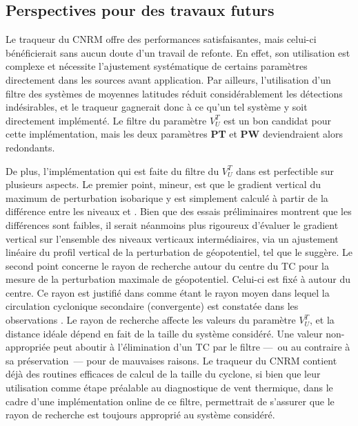 \documentclass[../main.tex]{subfiles}
\begin{document}
\subsection*{Perspectives pour des travaux futurs}

Le traqueur du CNRM offre des performances satisfaisantes, mais celui-ci bénéficierait sans aucun doute d'un travail de refonte. En effet, son utilisation est
complexe et nécessite l'ajustement systématique de certains paramètres directement dans les sources avant application. Par ailleurs, l'utilisation d'un filtre
des systèmes de moyennes latitudes réduit considérablement les détections indésirables, et le traqueur gagnerait donc à ce qu'un tel système y soit
directement implémenté. Le filtre du paramètre $V_U^T$ est un bon candidat pour cette implémentation, mais les deux paramètres \textbf{PT} et \textbf{PW}
deviendraient alors redondants.


De plus, l'implémentation qui est faite du filtre du $V_U^T$ dans \textcite{dulac_assessing_2023} est perfectible sur plusieurs aspects. Le premier point,
mineur, est que le gradient vertical du maximum de perturbation isobarique y est simplement calculé à partir de la différence entre les niveaux  et
. Bien que des essais préliminaires montrent que les différences sont faibles, il serait néanmoins plus rigoureux d'évaluer le gradient vertical sur
l'ensemble des niveaux verticaux intermédiaires, via un ajustement linéaire du profil vertical de la perturbation de géopotentiel, tel que
\textcite{hart_cyclone_2003} le suggère. Le second point concerne le rayon de recherche autour du centre du TC pour la mesure de la perturbation maximale de
géopotentiel. Celui-ci est fixé à  autour du centre. Ce rayon est justifié dans \textcite{hart_cyclone_2003} comme étant le rayon moyen dans lequel la
circulation cyclonique secondaire (convergente) est constatée dans les observations \parencite{frank_structure_1977}. Le rayon de recherche affecte les valeurs
du paramètre $V_U^T$, et la distance idéale dépend en fait de la taille du système considéré. Une valeur non-appropriée peut aboutir à l'élimination d'un TC par
le filtre ---~ou au contraire à sa préservation~--- pour de mauvaises raisons. Le traqueur du CNRM contient déjà des routines efficaces de calcul de la taille
du cyclone, si bien que leur utilisation comme étape préalable au diagnostique de vent thermique, dans le cadre d'une implémentation online de ce filtre,
permettrait de s'assurer que le rayon de recherche est toujours approprié au système considéré.
\end{document}
